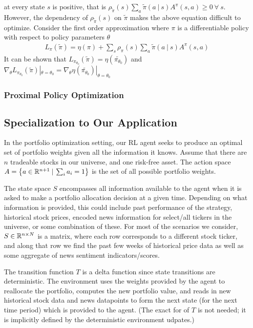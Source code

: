at every state $s$ is positive, that is $\rho_{\tilde{\pi}}(s)\sum_a \tilde{\pi}(a \:|\: s)A^\pi(s, a) \geq 0\ \forall \ s$. However, the dependency of 
$\rho_{\tilde{\pi}}(s)$ on $\tilde{\pi}$ makes the above equation difficult to optimize. Consider the first order approximation 
where $\pi$ is a differentiable policy with respect to policy parameters $\theta$
\begin{align*}
  L_{\pi}(\tilde{\pi}) = \eta(\pi) + \sum_s \rho_{\pi}(s) \sum_a \tilde{\pi}(a \:|\: s) A^\pi(s, a)
\end{align*}
It can be shown that $L_{\pi_{\theta_0}}(\tilde{\pi}) = \eta(\tilde{\pi_{\theta_0}})$ and $\nabla_\theta L_{\pi_{\theta_0}}(\tilde{\pi})|_{\theta=\theta_0} = \nabla_\theta \eta(\tilde{\pi_{\theta_0}})|_{\theta=\theta_0}$ 


\subsubsection{Proximal Policy Optimization}

\cite{ppo}

\subsection{Specialization to Our Application}

In the portfolio optimization setting, our RL agent seeks to produce an optimal set of portfolio weights given all the information it knows.
Assume that there are $n$ tradeable stocks in our universe, and one risk-free asset.
The action space $A = \left\{a \in \mathbb{R}^{n+1} \:|\: \sum_i a_i = 1\right\}$ is the set of all possible portfolio weights.

The state space $S$ encompasses all information available to the agent when it is asked to make a portfolio allocation decision at a given time.
Depending on what information is provided, this could include past performance of the strategy, historical stock prices, encoded news information for
select/all tickers in the universe, or some combination of these. For most of the scenarios we consider, $S \in \mathbb{R}^{n \times N}$ is a matrix, where
each row corresponds to a different stock ticker, and along that row we find the past few weeks of historical price data as well as some
aggregate of news sentiment indicators/scores.

The transition function $T$ is a delta function since state transitions are deterministic.
The environment uses the weights provided by the agent to reallocate the portfolio, computes the new portfolio value,
and reads in new historical stock data and news datapoints to form the next state (for the next time period) which is provided to the agent.
(The exact for of $T$ is not needed; it is implicitly defined by the deterministic environment udpates.)


